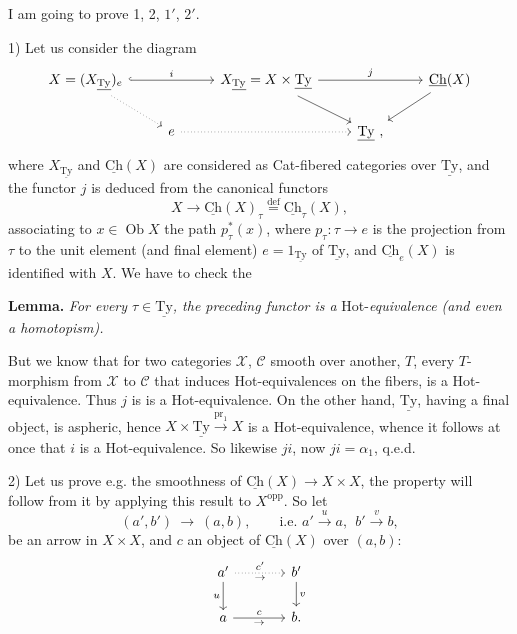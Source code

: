 \documentclass[11pt]{article}
\newcommand{\printedpage}[1]{\marginpar{\footnotesize p.~#1}}
\newcommand{\msp}[1]{\marginpar{\footnotesize [#1]}}
\newcommand{\Ch}{\underline{\mathrm{Ch}}}
\newcommand{\Ty}{\underline{\mathrm{Ty}}}
\newcommand{\cC}{\mathcal{C}}
\newcommand{\cX}{\mathcal{X}}
\newcommand{\Ob}{\operatorname{Ob}}
\begin{document}
\printedpage{100}
\msp{page 160}
I am going to prove 1, 2, $1'$, $2'$.

1) Let us consider the diagram
\[
\begin{tikzcd}
X = (X_{\Ty})_e \ar[rr,hook,"i"] \ar[dr,dotted] & & X_{\Ty} = X \times \Ty \ar[rr,"j"] \ar[dr] & & \Ch(X) \ar[dl] \\
& e \ar[rr,dotted] & & \Ty\ , &
\end{tikzcd}
\]
where $X_{\Ty}$ and $\Ch(X)$ are considered as Cat-fibered categories over $\Ty$, and the functor $j$ is deduced from the canonical functors
\[
X \longrightarrow \Ch(X)_{\tau} \overset{\text{def}}{=} \Ch_{\tau}(X),
\]
associating to $x \in \Ob X$ the path $p_{\tau}^{*}(x)$, where $p_{\tau} : \tau \longrightarrow e$ is the projection from $\tau$ to the unit element (and final element) $e = 1_{\Ty}$ of $\Ty$, and $\Ch_{e}(X)$ is identified with $X$. We have to check the

\textbf{Lemma.} \textit{For every $\tau \in \Ty$, the preceding functor is a} Hot-\textit{equivalence (and even a homotopism).}

But we know that for two categories $\cX$, $\cC$ smooth over another, $T$, every $T$-morphism from $\cX$ to $\cC$ that induces Hot-equivalences on the fibers, is a Hot-equivalence. Thus $j$ is
\msp{page 161}
is a Hot-equivalence. On the other hand, $\Ty$, having a final object, is aspheric, hence %
$X \times \Ty \xrightarrow{\mathrm{pr}_1} X$ is a Hot-equivalence, whence it follows at once that $i$ is a Hot-equivalence. So likewise $ji$, now $ji = \alpha_1$, q.e.d.

2) Let us prove e.g. the smoothness of $\Ch(X) \longrightarrow X \times X$, the property will follow from it by applying this result to $X^{\mathrm{opp}}$. So let
\[
(a',b') \ \longrightarrow\ (a,b), \qquad \text{i.e. } a' \xrightarrow{u} a,\ \ b' \xrightarrow{v} b,
\]
be an arrow in $X \times X$, and $c$ an object of $\Ch(X)$ over $(a,b)$:
\[
\begin{tikzcd}[column sep=large]
a' \ar[r,dotted,"c'","\scriptstyle\rightarrow"'] \ar[d,"u"'] & b' \ar[d,"v"] \\
a \ar[r,"c","\scriptstyle\rightarrow"'] & b.
\end{tikzcd}
\]
\end{document}
